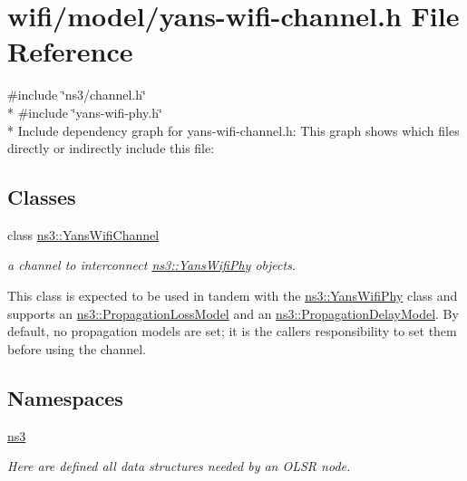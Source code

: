 \hypertarget{yans-wifi-channel_8h}{}\section{wifi/model/yans-\/wifi-\/channel.h File Reference}
\label{yans-wifi-channel_8h}
{\ttfamily \#include \char`\"{}ns3/channel.\+h\char`\"{}}\\*
{\ttfamily \#include \char`\"{}yans-\/wifi-\/phy.\+h\char`\"{}}\\*
Include dependency graph for yans-\/wifi-\/channel.h\+:
This graph shows which files directly or indirectly include this file\+:
\subsection*{Classes}
\begin{DoxyCompactItemize}
\item 
class \hyperlink{classns3_1_1YansWifiChannel}{ns3\+::\+Yans\+Wifi\+Channel}
\begin{DoxyCompactList}\small\item\em a channel to interconnect \hyperlink{classns3_1_1YansWifiPhy}{ns3\+::\+Yans\+Wifi\+Phy} objects.

This class is expected to be used in tandem with the \hyperlink{classns3_1_1YansWifiPhy}{ns3\+::\+Yans\+Wifi\+Phy} class and supports an \hyperlink{classns3_1_1PropagationLossModel}{ns3\+::\+Propagation\+Loss\+Model} and an \hyperlink{classns3_1_1PropagationDelayModel}{ns3\+::\+Propagation\+Delay\+Model}. By default, no propagation models are set; it is the caller\textquotesingle{}s responsibility to set them before using the channel. \end{DoxyCompactList}\end{DoxyCompactItemize}
\subsection*{Namespaces}
\begin{DoxyCompactItemize}
\item 
 \hyperlink{namespacens3}{ns3}
\begin{DoxyCompactList}\small\item\em Here are defined all data structures needed by an O\+L\+SR node. \end{DoxyCompactList}\end{DoxyCompactItemize}
